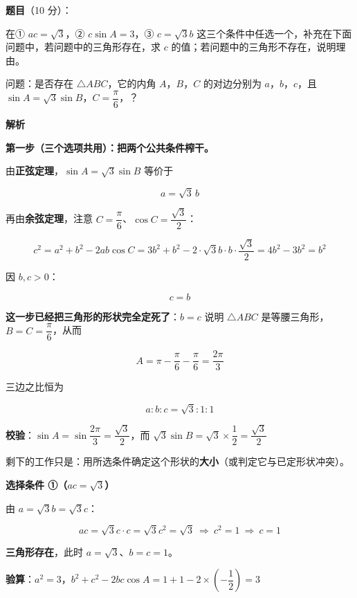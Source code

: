 \begin{answer}

\textbf{题目}（10 分）：

在① $ac=\sqrt3$，② $c\sin A=3$，③ $c=\sqrt3b$ 这三个条件中任选一个，补充在下面问题中，若问题中的三角形存在，求 $c$ 的值；若问题中的三角形不存在，说明理由。

问题：是否存在 $\triangle ABC$，它的内角 $A$，$B$，$C$ 的对边分别为 $a$，$b$，$c$，且 $\sin A=\sqrt3\sin B$，$C=\dfrac\pi6$，\gkblank{}？

\textbf{解析}

\par\medskip

\textbf{第一步（三个选项共用）：把两个公共条件榨干。}

由\textbf{正弦定理}，$\sin A=\sqrt3\sin B$ 等价于

\nopagebreak[4]
\[a=\sqrt3\,b\]

再由\textbf{余弦定理}，注意 $C=\dfrac\pi6$、$\cos C=\dfrac{\sqrt3}2$：

\nopagebreak[4]
\[c^{2}=a^{2}+b^{2}-2ab\cos C=3b^{2}+b^{2}-2\cdot\sqrt3b\cdot b\cdot\frac{\sqrt3}2=4b^{2}-3b^{2}=b^{2}\]

因 $b,c>0$：

\nopagebreak[4]
\[\boxed{c=b}\]

\textbf{这一步已经把三角形的形状完全定死了}：$b=c$ 说明 $\triangle ABC$ 是等腰三角形，$B=C=\dfrac\pi6$，从而

\nopagebreak[4]
\[A=\pi-\frac\pi6-\frac\pi6=\frac{2\pi}3\]

三边之比恒为

\nopagebreak[4]
\[a:b:c=\sqrt3:1:1\]

\textbf{校验}：$\sin A=\sin\dfrac{2\pi}3=\dfrac{\sqrt3}2$，而 $\sqrt3\sin B=\sqrt3\times\dfrac12=\dfrac{\sqrt3}2$ 

剩下的工作只是：用所选条件确定这个形状的\textbf{大小}（或判定它与已定形状冲突）。

\par\medskip

\textbf{选择条件 ①（$ac=\sqrt3$）}

由 $a=\sqrt3b=\sqrt3c$：

\nopagebreak[4]
\[ac=\sqrt3c\cdot c=\sqrt3c^{2}=\sqrt3\ \Longrightarrow\ c^{2}=1\ \Longrightarrow\ c=1\]

\textbf{三角形存在}，此时 $a=\sqrt3$、$b=c=1$。

\textbf{验算}：$a^{2}=3$，$b^{2}+c^{2}-2bc\cos A=1+1-2\times\left(-\dfrac12\right)=3$ 


\end{answer}
